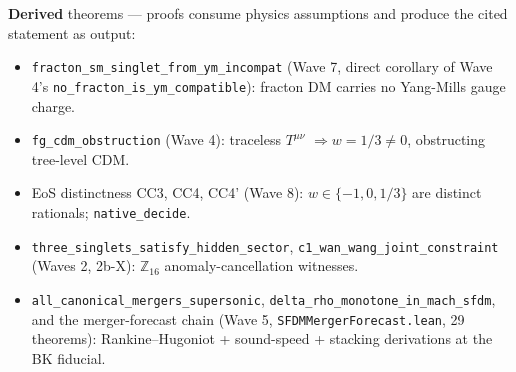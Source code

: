 \documentclass[aps,prd,twocolumn,showpacs,superscriptaddress,nofootinbib]{revtex4-2}
\begin{document}
\textbf{Derived} theorems — proofs consume physics assumptions and
produce the cited statement as output:
\begin{itemize}
\item \texttt{fracton\_sm\_singlet\_from\_ym\_incompat} (Wave 7, direct
  corollary of Wave 4's \texttt{no\_fracton\_is\_ym\_compatible}): fracton DM
  carries no Yang-Mills gauge charge.
\item \texttt{fg\_cdm\_obstruction} (Wave 4): traceless $T^{\mu\nu}$
  $\Rightarrow w = 1/3 \neq 0$, obstructing tree-level CDM.
\item EoS distinctness CC3, CC4, CC4' (Wave 8): $w \in \{-1, 0, 1/3\}$
  are distinct rationals; \texttt{native\_decide}.
\item \texttt{three\_singlets\_satisfy\_hidden\_sector},
  \texttt{c1\_wan\_wang\_joint\_constraint} (Waves 2, 2b-X):
  $\mathbb{Z}_{16}$ anomaly-cancellation witnesses.
\item \texttt{all\_canonical\_mergers\_supersonic},
  \texttt{delta\_rho\_monotone\_in\_mach\_sfdm}, and the merger-forecast
  chain (Wave 5, \texttt{SFDMMergerForecast.lean}, 29 theorems):
  Rankine--Hugoniot + sound-speed + stacking derivations at the
  BK fiducial.
\end{itemize}
\end{document}
